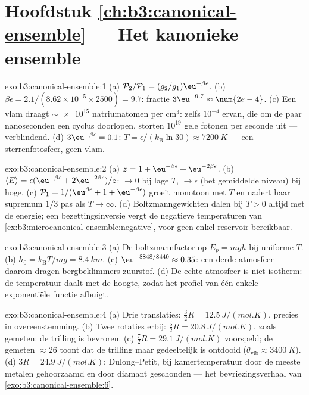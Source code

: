 \section*{Hoofdstuk \ref{ch:b3:canonical-ensemble} --- Het kanonieke ensemble}

\begin{solution}{exo:b3:canonical-ensemble:1}
(a) $\mathcal P_2/\mathcal P_1 = (g_2/g_1)\eu^{-\beta\epsilon}$.
(b) $\beta\epsilon = 2.1/(8.62\times10^{-5} \times 2500) = 9.7$:
fractie $3\eu^{-9.7} \approx \num{2e-4}$. (c) Een vlam draagt
$\sim\num{e15}$ natriumatomen per cm$^3$: zelfs $10^{-4}$ ervan, die om
de paar nanoseconden een cyclus doorlopen, storten $10^{19}$ gele fotonen
per seconde uit --- verblindend. (d) $3\eu^{-\beta\epsilon} = 0.1$:
$T = \epsilon/(k_{\text{B}}\ln30) \approx \qty{7200}{K}$ --- een
sterrenfotosfeer, geen vlam.
\end{solution}

\begin{solution}{exo:b3:canonical-ensemble:2}
(a) $z = 1 + \eu^{-\beta\epsilon} + \eu^{-2\beta\epsilon}$. (b)
$\langle E\rangle = \epsilon(\eu^{-\beta\epsilon} +
2\eu^{-2\beta\epsilon})/z$: $\to 0$ bij lage $T$, $\to \epsilon$
(het gemiddelde niveau) bij hoge. (c) $\mathcal P_1 = 1/(\eu^{\beta
\epsilon} + 1 + \eu^{-\beta\epsilon})$ groeit monotoon met $T$ en nadert
haar supremum $1/3$ pas als $T \to \infty$. (d) Boltzmanngewichten dalen
bij $T > 0$ altijd met de energie; een bezettingsinversie vergt de
negatieve temperaturen van
\cref{ex:b3:microcanonical-ensemble:negative}, voor geen enkel reservoir
bereikbaar.
\end{solution}

\begin{solution}{exo:b3:canonical-ensemble:3}
(a) De boltzmannfactor op $E_p = mgh$ bij uniforme $T$. (b) $h_0 =
k_{\text{B}}T/mg = \qty{8.4}{km}$. (c) $\eu^{-8848/8440} \approx
0.35$: een derde atmosfeer --- daarom dragen bergbeklimmers zuurstof.
(d) De echte atmosfeer is niet isotherm: de temperatuur daalt met de
hoogte, zodat het profiel van één enkele exponentiële functie afbuigt.
\end{solution}

\begin{solution}{exo:b3:canonical-ensemble:4}
(a) Drie translaties: $\tfrac32 R = \qty{12.5}{J/(mol.K)}$, precies in
overeenstemming. (b) Twee rotaties erbij: $\tfrac52 R =
\qty{20.8}{J/(mol.K)}$, zoals gemeten: de trilling is bevroren. (c)
$\tfrac72 R = \qty{29.1}{J/(mol.K)}$ voorspeld; de gemeten $\approx26$
toont dat de trilling maar gedeeltelijk is ontdooid ($\theta_{\text{vib}}
\approx \qty{3400}{K}$). (d) $3R = \qty{24.9}{J/(mol.K)}$:
Dulong--Petit, bij kamertemperatuur door de meeste metalen gehoorzaamd en
door diamant geschonden --- het bevriezingsverhaal van
\cref{exo:b3:canonical-ensemble:6}.
\end{solution}

